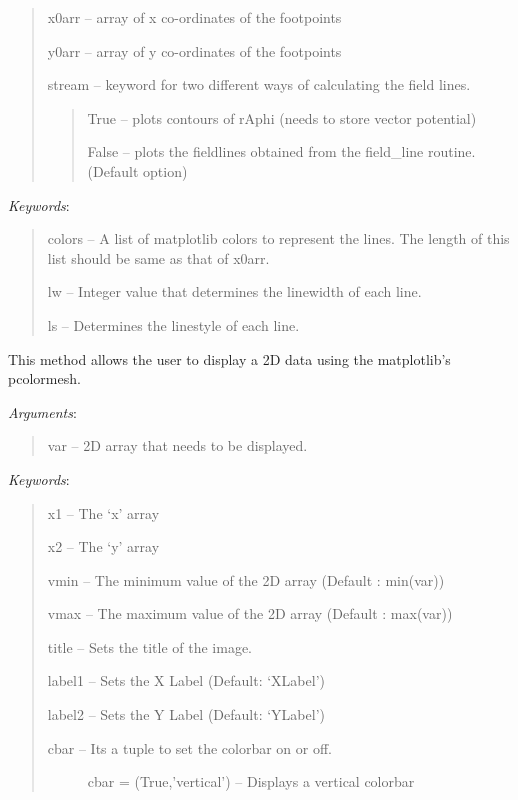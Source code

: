 \documentclass[letterpaper,10pt,english]{sphinxmanual}
\begin{document}
\begin{fulllineitems}
\begin{fulllineitems}
\begin{quote}
x0arr -- array of x co-ordinates of the footpoints

y0arr -- array of y co-ordinates of the footpoints

stream -- keyword for two different ways of calculating the field lines.
\begin{quote}

True -- plots contours of rAphi (needs to store vector potential)

False -- plots the fieldlines obtained from the field\_line routine. (Default option)
\end{quote}
\end{quote}

\emph{Keywords}:
\begin{quote}

colors -- A list of matplotlib colors to represent the lines. The length of this list should be same as that of x0arr.

lw -- Integer value that determines the linewidth of each line.

ls -- Determines the linestyle of each line.
\end{quote}

\end{fulllineitems}


\begin{fulllineitems}
\label{image:pyPLUTO.Image.pldisplay}
This method allows the user to display a 2D data using the matplotlib's pcolormesh.

\emph{Arguments}:
\begin{quote}

var -- 2D array that needs to be displayed.
\end{quote}

\emph{Keywords}:
\begin{quote}

x1 -- The `x' array

x2 -- The `y' array

vmin -- The minimum value of the 2D array (Default : min(var))

vmax -- The maximum value of the 2D array (Default : max(var))

title -- Sets the title of the image.

label1 -- Sets the X Label (Default: `XLabel')

label2 -- Sets the Y Label (Default: `YLabel')
\begin{description}
\item[{cbar -- Its a tuple to set the colorbar on or off. }] \leavevmode
cbar = (True,'vertical') -- Displays a vertical colorbar


\end{description}
\end{quote}
\end{fulllineitems}
\end{fulllineitems}
\end{document}
